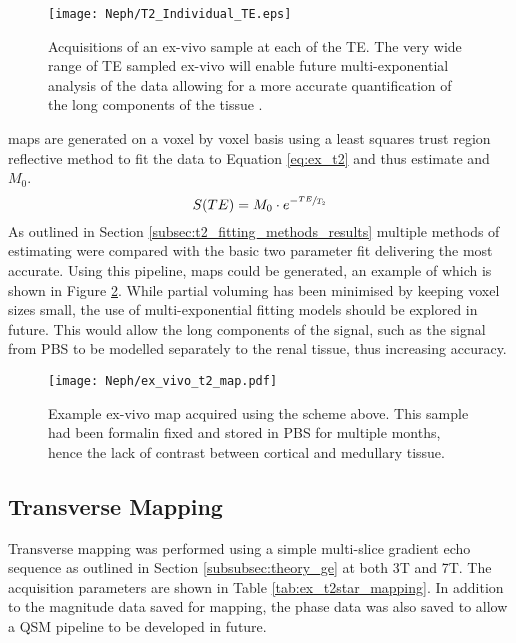 \begin{figure}[H]
	\centering
	\texttt{[image: Neph/T2\_Individual\_TE.eps]}
	\caption{Acquisitions of an ex-vivo sample at each of the \ac{TE}. The very wide range of \ac{TE} sampled ex-vivo will enable future multi-exponential analysis of the data allowing for a more accurate quantification of the long \ttwo components of the tissue \cite{bjarnason_analyzennls_2010, sabouri_mr_2017}.}
	\label{fig:ex_t2_raw_data}	
\end{figure}

\ttwo maps are generated on a voxel by voxel basis using a least squares trust region reflective method to fit the data to Equation \eqref{eq:ex_t2} and thus estimate \ttwo and $M_0$. 
\begin{equation}
	S(TE) = M_0 \cdot e^{-\sfrac{TE}{T_2}}
	\label{eq:ex_t2}
\end{equation}
As outlined in Section \ref{subsec:t2_fitting_methods_results} multiple methods of estimating \ttwo were compared with the basic two parameter fit delivering the most accurate. Using this pipeline, \ttwo maps could be generated, an example of which is shown in Figure \ref{fig:ex_t2_map}. While partial voluming has been minimised by keeping voxel sizes small, the use of multi-exponential fitting models should be explored in future. This would allow the long \ttwo components of the signal, such as the signal from \ac{PBS} to be modelled separately to the renal tissue, thus increasing accuracy. 

\begin{figure}[H]
	\centering
	\texttt{[image: Neph/ex\_vivo\_t2\_map.pdf]}
	\caption{Example ex-vivo \ttwo map acquired using the scheme above. This sample had been formalin fixed and stored in \ac{PBS} for multiple months, hence the lack of contrast between cortical and medullary tissue.}
	\label{fig:ex_t2_map}
\end{figure}

\subsection{Transverse \ttwostar Mapping}

Transverse \ttwostar mapping was performed using a simple multi-slice gradient echo sequence as outlined in Section \ref{subsubsec:theory_ge} at both 3T and 7T. The acquisition parameters are shown in Table \ref{tab:ex_t2star_mapping}. In addition to the magnitude data saved for \ttwostar mapping, the phase data was also saved to allow a \ac{QSM} pipeline to be developed in future.

